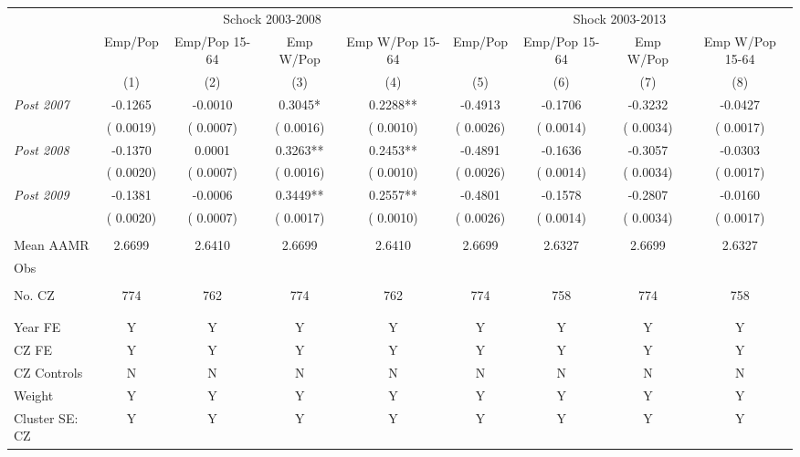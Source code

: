 \begin{tabular}{lcccccccc} \hline \hline
& \multicolumn{4}{c}{Schock 2003-2008} & \multicolumn{4}{c}{Shock 2003-2013} \\ 
& \multicolumn{1}{c}{Emp/Pop} & \multicolumn{1}{c}{Emp/Pop 15-64} & \multicolumn{1}{c}{Emp W/Pop} & \multicolumn{1}{c}{Emp W/Pop 15-64} & \multicolumn{1}{c}{Emp/Pop} & \multicolumn{1}{c}{Emp/Pop 15-64} & \multicolumn{1}{c}{Emp W/Pop} & \multicolumn{1}{c}{Emp W/Pop 15-64}  \\ 
\cmidrule(lr){2-2}\cmidrule(lr){3-3}\cmidrule(lr){4-4} \cmidrule(lr){5-5}\cmidrule(lr){6-6}\cmidrule(lr){7-7}\cmidrule(lr){8-8} \cmidrule(lr){9-9}
& (1) & (2) & (3) & (4) & (5) & (6) & (7) & (8) \\  \toprule
\textit{Post 2007} &      -0.1265  &      -0.0010 &       0.3045* &       0.2288** &      -0.4913  &      -0.1706 &      -0.3232 &      -0.0427\\  
& (      0.0019)  & (      0.0007) & (      0.0016) & (      0.0010) & (      0.0026)  & (      0.0014) & (      0.0034) & (      0.0017)\\ 
\textit{Post 2008} &      -0.1370  &       0.0001 &       0.3263** &       0.2453** &      -0.4891  &      -0.1636 &      -0.3057 &      -0.0303\\  
 & (      0.0020) & (      0.0007) & (      0.0016) & (      0.0010) & (      0.0026) & (      0.0014) & (      0.0034) & (      0.0017) \\ 
\textit{Post 2009} &      -0.1381  &      -0.0006 &       0.3449** &       0.2557** &      -0.4801  &      -0.1578 &      -0.2807 &      -0.0160 \\  
& (      0.0020)  & (      0.0007) & (      0.0017) & (      0.0010) & (      0.0026)  & (      0.0014) & (      0.0034) & (      0.0017) \\ 
&  &   &  & &  &   &  &   \\ 
Mean AAMR &       2.6699  &       2.6410 &       2.6699 &       2.6410 &       2.6699  &       2.6327 &       2.6699 &       2.6327  \\  
Obs &   &  &  &  &   &  &  &  \\ \\  
No. CZ &          774  &          762 &          774 &          762 &          774  &          758 &          774 &          758 \\ \\  
&  &  &  & &  &  &  &      \\  
Year FE & Y & Y & Y & Y & Y & Y & Y & Y  \\ 
CZ FE & Y & Y & Y & Y & Y & Y & Y & Y \\ 
CZ Controls & N  & N & N & N & N  & N & N & N    \\  
Weight & Y & Y & Y & Y & Y & Y & Y & Y \\ 
Cluster SE: CZ & Y & Y & Y & Y & Y & Y & Y & Y \\ 
\bottomrule
\end{tabular}